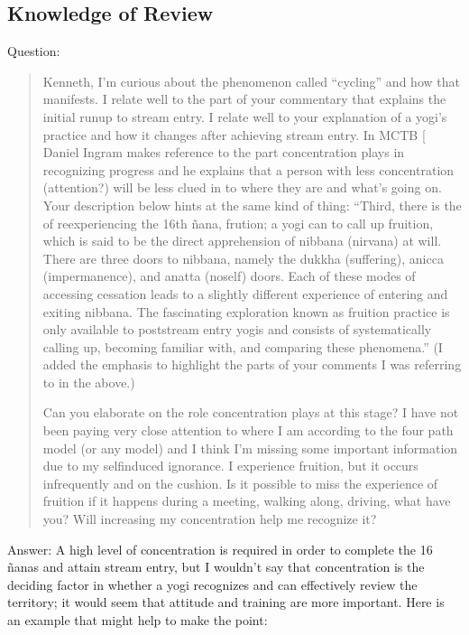 \documentclass[a5paper,10pt,english]{book}
\begin{document}
\subsection{Knowledge of Review}
\label{\detokenize{main-2:knowledge-of-review}}
\sphinxAtStartPar
Question:
\begin{quote}

\sphinxAtStartPar
Kenneth, I’m curious about the phenomenon called “cycling” and how
that manifests. I relate well to the part of your commentary that
explains the initial run\sphinxhyphen{}up to stream entry. I relate well to your
explanation of a yogi’s practice and how it changes after achieving
stream entry. In MCTB
{[}\sphinxurl{https://www.amazon.com/Mastering-Core-Teachings-Buddha-Unusually/dp/1904658407}{]}
Daniel Ingram makes reference to the part concentration plays
in recognizing progress and he explains that a person with less
concentration (attention?) will be less clued in to where they are
and what’s going on. Your description below hints at the same kind
of thing: “Third, there is the  of re\sphinxhyphen{}experiencing
the 16th ñana, frution; a yogi can  to call up fruition,
which is said to be the direct apprehension of nibbana (nirvana) at
will. There are three doors to nibbana, namely the dukkha
(suffering), anicca (impermanence), and anatta (no\sphinxhyphen{}self) doors. Each
of these modes of accessing cessation leads to a slightly different
experience of entering and exiting nibbana. The fascinating
exploration known as fruition practice is only available to
post\sphinxhyphen{}stream entry yogis and consists of systematically calling up,
becoming familiar with, and comparing these phenomena.” (I added the
emphasis to highlight the parts of your comments I was referring to
in the above.)

\sphinxAtStartPar
Can you elaborate on the role concentration plays at this stage? I
have not been paying very close attention to where I am according to
the four path model (or any model) and I think I’m missing some
important information due to my self\sphinxhyphen{}induced ignorance. I experience
fruition, but it occurs infrequently and on the cushion. Is it
possible to miss the experience of fruition if it happens during a
meeting, walking along, driving, what have you? Will increasing my
concentration help me recognize it?
\end{quote}

\sphinxAtStartPar
Answer: A high level of concentration is required in order to complete
the 16 ñanas and attain stream entry, but I wouldn’t say that
concentration is the deciding factor in whether a yogi recognizes and
can effectively review the territory; it would seem that attitude and
training are more important. Here is an example that might help to make
the point:
\end{document}
